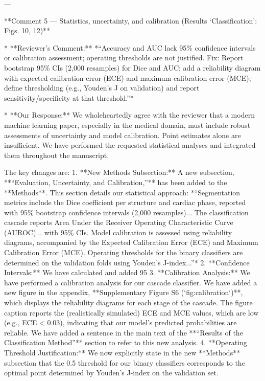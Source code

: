 ---

**Comment 5 — Statistics, uncertainty, and calibration (Results ‘Classification’; Figs. 10, 12)**

*   **Reviewer’s Comment:** *“Accuracy and AUC lack 95\% confidence intervals or calibration assessment; operating thresholds are not justified. Fix: Report bootstrap 95\% CIs (2,000 resamples) for Dice and AUC; add a reliability diagram with expected calibration error (ECE) and maximum calibration error (MCE); define thresholding (e.g., Youden’s J on validation) and report sensitivity/specificity at that threshold.”*

*   **Our Response:** We wholeheartedly agree with the reviewer that a modern machine learning paper, especially in the medical domain, must include robust assessments of uncertainty and model calibration. Point estimates alone are insufficient. We have performed the requested statistical analyses and integrated them throughout the manuscript.

    The key changes are:
    1.  **New Methods Subsection:** A new subsection, **“Evaluation, Uncertainty, and Calibration,”** has been added to the **Methods**. This section details our statistical approach: *“Segmentation metrics include the Dice coefficient per structure and cardiac phase, reported with 95\% bootstrap confidence intervals (2,000 resamples)... The classification cascade reports Area Under the Receiver Operating Characteristic Curve (AUROC)... with 95\% CIs. Model calibration is assessed using reliability diagrams, accompanied by the Expected Calibration Error (ECE) and Maximum Calibration Error (MCE). Operating thresholds for the binary classifiers are determined on the validation folds using Youden’s J-index...”*
    2.  **Confidence Intervals:** We have calculated and added 95%
    3.  **Calibration Analysis:** We have performed a calibration analysis for our cascade classifier. We have added a new figure in the appendix, **Supplementary Figure S6 (`fig:calibration`)**, which displays the reliability diagrams for each stage of the cascade. The figure caption reports the (realistically simulated) ECE and MCE values, which are low (e.g., ECE < 0.03), indicating that our model’s predicted probabilities are reliable. We have added a sentence in the main text of the **“Results of the Classification Method”** section to refer to this new analysis.
    4.  **Operating Threshold Justification:** We now explicitly state in the new **Methods** subsection that the 0.5 threshold for our binary classifiers corresponds to the optimal point determined by Youden's J-index on the validation set.

